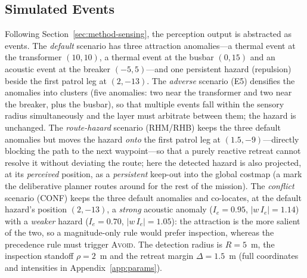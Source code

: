 \subsection{Simulated Events}
\label{sec:setup-events}
Following Section~\ref{sec:method-sensing}, the perception output is abstracted
as events. The \emph{default} scenario has three attraction anomalies---a
thermal event at the transformer $(10,10)$, a thermal event at the busbar
$(0,15)$ and an acoustic event at the breaker $(-5,5)$---and one persistent
hazard (repulsion) beside the first patrol leg at $(2,-13)$. The \emph{adverse}
scenario (E5) densifies the anomalies into clusters (five anomalies: two near
the transformer and two near the breaker, plus the busbar), so that multiple
events fall within the sensory radius simultaneously and the layer must
arbitrate between them; the hazard is unchanged. The \emph{route-hazard} scenario
(RHM/RHB) keeps the three default anomalies but moves the hazard \emph{onto} the
first patrol leg at $(1.5,-9)$---directly blocking the path to the next
waypoint---so that a purely reactive retreat cannot resolve it without deviating
the route; here the detected hazard is also projected, at its \emph{perceived}
position, as a \emph{persistent} keep-out into the global costmap (a mark the
deliberative planner routes around for the rest of the mission). The \emph{conflict} scenario
(CONF) keeps the three default anomalies and co-locates, at the default hazard's
position $(2,-13)$, a \emph{strong} acoustic anomaly ($I_e=0.95$,
$|w\,I_e|=1.14$) with a \emph{weaker} hazard ($I_e=0.70$, $|w\,I_e|=1.05$): the
attraction is the more salient of the two, so a magnitude-only rule would prefer
inspection, whereas the precedence rule must trigger \textsc{Avoid}. The
detection radius is $R=5$~m, the inspection standoff $\rho=2$~m and the retreat
margin $\Delta=1.5$~m (full coordinates and intensities in
Appendix~\ref{app:params}).

